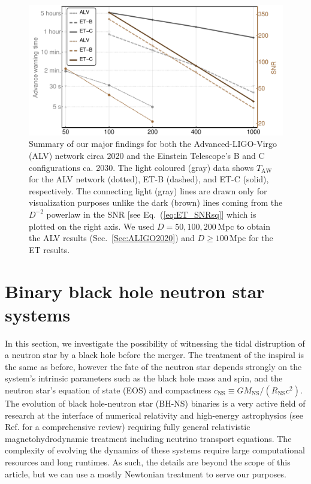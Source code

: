 \documentclass[amsmath,amssymb,aps,floats,amsfonts,notitlepage,superscriptaddress,eqsecnum,nofootinbib,10pt]{revtex4-1}
\begin{document}
\begin{figure}[h!]
\includegraphics[width=\linewidth]{../Figures/Main_results.pdf}
\caption{Summary of our major findings for both the Advanced-LIGO-Virgo (ALV) network circa 2020 and the Einstein Telescope's B and C configurations
ca. 2030. The light coloured (gray) data shows $T_\text{AW}$ for the ALV network (dotted), ET-B (dashed), and ET-C (solid), respectively.
The connecting light (gray) lines are drawn only for visualization purposes unlike the dark (brown) lines coming from the $D^{-2}$ powerlaw in the SNR [see Eq.~(\ref{eq:ET_SNRsq}] which is plotted on the right axis. 
We used $D=50,100,200\,$Mpc to obtain the ALV results (Sec.~\ref{Sec:ALIGO2020}) and $D\ge 100\,$Mpc for the ET results.}\label{fig:summary}
\end{figure}





\section{Binary black hole neutron star systems}
In this section, we investigate the possibility of witnessing the tidal distruption of a neutron star by a black hole before the merger.
The treatment of the inspiral is the same as before, however the fate of the neutron star depends strongly on the system's intrinsic parameters
such as the black hole mass and spin, and the neutron star's equation of state (EOS) and compactness $c_\text{NS}\equiv G M_\text{NS}/(R_\text{NS}c^2)$. 
The evolution of black hole-neutron star (BH-NS) binaries is a very active field of research at the interface of numerical relativity and high-energy astrophysics
(see Ref. \cite{Shibata:2011jka} for a comprehensive review) requiring fully general relativistic magnetohydrodynamic treatment including neutrino transport equations.
The complexity of evolving the dynamics of these systems require large computational resources and long runtimes.
As such, the details are beyond the scope of this article, but we can use a mostly Newtonian treatment to serve our purposes. %
\end{document}
